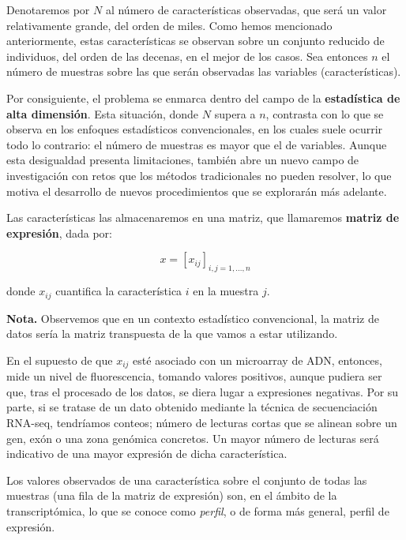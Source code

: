 Denotaremos por $N$ al número de características observadas, que será un valor relativamente grande, del orden
de miles. Como hemos mencionado anteriormente, estas características se observan sobre un conjunto reducido de 
individuos, del orden de las decenas, en el mejor de los casos. Sea entonces $n$ el número de muestras sobre
las que serán observadas las variables (características). \newline

Por consiguiente, el problema se enmarca dentro del campo de la \textbf{estadística de alta dimensión}. Esta
situación, donde $N$ supera a $n$, contrasta con lo que se observa en los enfoques estadísticos convencionales,
en los cuales suele ocurrir todo lo contrario: el número de muestras es mayor que el de variables. Aunque esta
desigualdad presenta limitaciones, también abre un nuevo campo de investigación con retos que los métodos 
tradicionales no pueden resolver, lo que motiva el desarrollo de nuevos procedimientos que se explorarán más 
adelante. \newline

Las características las almacenaremos en una matriz, que llamaremos \textbf{matriz de expresión}, dada por:

\[
    x = [x_{ij}]_{i,j=1,...,n}
\]

donde $x_{ij}$ cuantifica la característica $i$ en la muestra $j$. \newline

\textbf{Nota.} Observemos que en un contexto estadístico
convencional, la matriz de datos sería la matriz transpuesta de la que vamos a estar utilizando. \newline

En el supuesto de que $x_{ij}$ esté asociado con un microarray de ADN, entonces, mide un nivel de fluorescencia,
tomando valores positivos, aunque pudiera ser que, tras el procesado de los datos, se diera lugar a expresiones 
negativas. Por su parte, si se tratase de un dato obtenido mediante la técnica de secuenciación RNA-seq, tendríamos conteos; 
número de lecturas cortas que se alinean sobre un gen, exón o una zona genómica concretos. Un mayor número de
lecturas será indicativo de una mayor expresión de dicha característica. \newline

Los valores observados de una característica sobre el conjunto de todas las muestras (una fila de la matriz de
expresión) son, en el ámbito de la transcriptómica, lo que se conoce como \textit{perfil}, o de forma más general,
perfil de expresión. \newline

